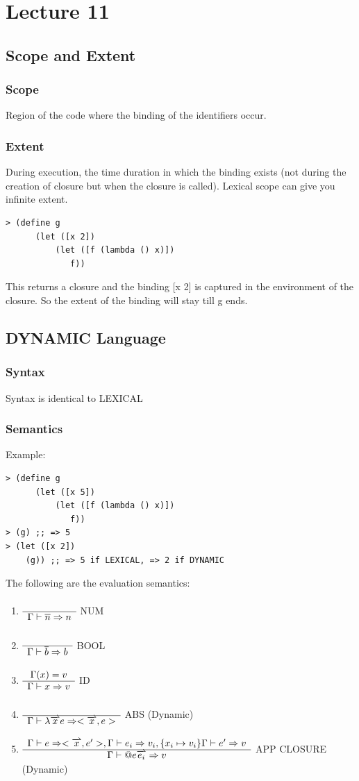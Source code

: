 \chapter{Lecture 11}

\section{Scope and Extent}
\subsection{Scope}
    Region of the code where the binding of the identifiers occur.
\subsection{Extent}
    During execution, the time duration in which the binding exists (not during the creation of closure but when the closure is called). Lexical scope can give you infinite extent.
\begin{verbatim}
> (define g
      (let ([x 2])
          (let ([f (lambda () x)])
             f))
\end{verbatim}
This returns a closure and the binding [x 2] is captured in the environment of the closure. So the extent of the binding will stay till g ends.

\section{DYNAMIC Language}
\subsection{Syntax}
Syntax is identical to LEXICAL
\subsection{Semantics}
Example:
\begin{verbatim}
> (define g
      (let ([x 5])
          (let ([f (lambda () x)])
             f))
> (g) ;; => 5
> (let ([x 2])
    (g)) ;; => 5 if LEXICAL, => 2 if DYNAMIC 
\end{verbatim}
The following are the evaluation semantics:

\begin{enumerate}
\item $\begin{array}{c}  \\ \hline \Gamma \vdash \overline{n} \Rightarrow n \end{array}$ NUM
\item $\begin{array}{c}  \\ \hline \Gamma \vdash \overline{b} \Rightarrow b \end{array}$ BOOL
\item $\begin{array}{c} \Gamma(x) = v \\ \hline \Gamma \vdash x \Rightarrow v \end{array}$ ID
\item $\bigfrac{}{\Gamma \vdash \lambda \overrightharpoonup{x} e \Rightarrow <\overrightharpoonup{x}, e>}$ ABS (Dynamic)
\item $\bigfrac{\Gamma \vdash e \Rightarrow <\overrightharpoonup{x}, e'>, \Gamma \vdash e_{i} \Rightarrow v_{i}, \{x_{i} \mapsto v_{i}\}\Gamma \vdash e' \Rightarrow v }{\Gamma \vdash @ e \overrightharpoonup{e_{i}} \Rightarrow v}$ APP CLOSURE (Dynamic)
\end{enumerate}

